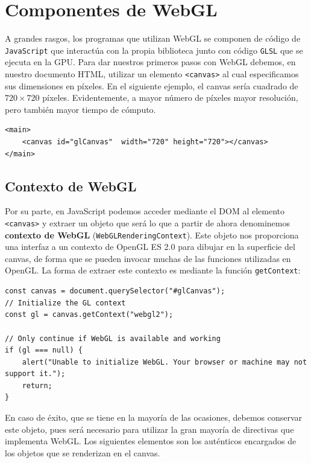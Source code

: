 \section{Componentes de WebGL}

A grandes rasgos, los programas que utilizan WebGL se componen de código de \verb|JavaScript| que interactúa con la propia biblioteca junto con código \verb|GLSL| que se ejecuta en la GPU. Para dar nuestros primeros pasos con WebGL debemos, en nuestro documento HTML, utilizar un elemento \verb|<canvas>| al cual especificamos sus dimensiones en píxeles. En el siguiente ejemplo, el canvas sería cuadrado de $720\times 720$ píxeles. Evidentemente, a mayor número de píxeles mayor resolución, pero también mayor tiempo de cómputo.

\begin{lstlisting}
<main>
    <canvas id="glCanvas"  width="720" height="720"></canvas>
</main>
\end{lstlisting}

\subsection{Contexto de WebGL}

Por su parte, en JavaScript podemos acceder mediante el DOM al elemento \verb|<canvas>| y extraer un objeto que será lo que a partir de ahora denominemos \textbf{contexto de WebGL} (\verb|WebGLRenderingContext|). Este objeto nos proporciona una interfaz a un contexto de OpenGL ES 2.0 para dibujar en la superficie del canvas, de forma que se pueden invocar muchas de las funciones utilizadas en OpenGL. La forma de extraer este contexto es mediante la función \verb|getContext|:

\begin{lstlisting}
const canvas = document.querySelector("#glCanvas");
// Initialize the GL context
const gl = canvas.getContext("webgl2");

// Only continue if WebGL is available and working
if (gl === null) {
    alert("Unable to initialize WebGL. Your browser or machine may not support it.");
    return;
}
\end{lstlisting}

En caso de éxito, que se tiene en la mayoría de las ocasiones, debemos conservar este objeto, pues será necesario para utilizar la gran mayoría de directivas que implementa WebGL. Los siguientes elementos son los auténticos encargados de los objetos que se renderizan en el canvas.

